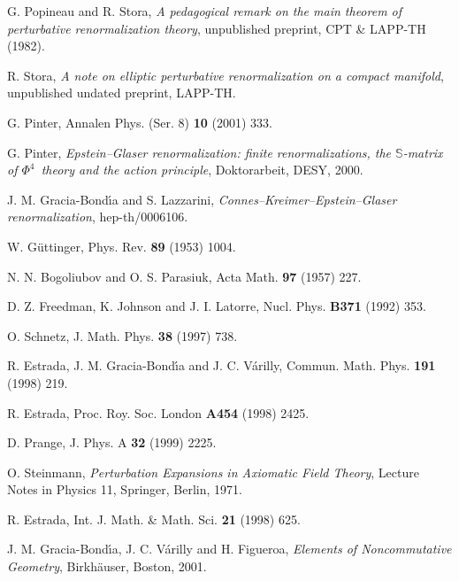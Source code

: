 \documentclass[a4paper,12pt]{article}
\newcommand{\Sf}{\mathbb{S}}       %
\newcommand{\7}{\dagger}           %
\theoremstyle{plain}
\theoremstyle{definition}
\begin{document}
\begin{thebibliography}{53}
G. Popineau and R. Stora,
\textsl{A pedagogical remark on the main theorem of perturbative
renormalization theory},
unpublished preprint, CPT \& LAPP-TH (1982).

R. Stora,
\textsl{A note on elliptic perturbative renormalization on a compact
manifold},
unpublished undated preprint, LAPP-TH.

G. Pinter,
Annalen Phys. (Ser. 8) {\bf 10} (2001) 333.

G. Pinter,
\textsl{Epstein--Glaser renormalization: finite renormalizations,
the $\Sf$-matrix of $\Phi^4$~theory and the action principle},
Doktorarbeit, DESY, 2000.

J. M. Gracia-Bond\'{\i}a and S. Lazzarini,
\textsl{Connes--Kreimer--Epstein--Glaser renormalization},
hep-th/0006106.

W. G\"uttinger,
Phys. Rev. {\bf 89} (1953) 1004.

N. N. Bogoliubov and O. S. Parasiuk,
Acta Math. {\bf97} (1957) 227.

D. Z. Freedman, K. Johnson and J. I. Latorre,
Nucl. Phys. {\bf B371} (1992) 353.

O. Schnetz,
J. Math. Phys. {\bf 38} (1997) 738.

R. Estrada, J. M. Gracia-Bond\'{\i}a and J. C. V\'arilly,
Commun. Math. Phys. {\bf 191} (1998) 219.

R. Estrada,
Proc. Roy. Soc. London {\bf A454} (1998) 2425.

D. Prange,
J. Phys. A {\bf 32} (1999) 2225.

O. Steinmann,
\textit{Perturbation Expansions in Axiomatic Field Theory},
Lecture Notes in Physics 11, Springer, Berlin, 1971.

R. Estrada,
Int. J. Math. \& Math. Sci. {\bf 21} (1998) 625.

J. M. Gracia-Bond\'{\i}a, J. C. V\'arilly and H. Figueroa,
\textit{Elements of Noncommutative Geometry},
Birkh\"auser, Boston, 2001.


\end{thebibliography}
\end{document}
